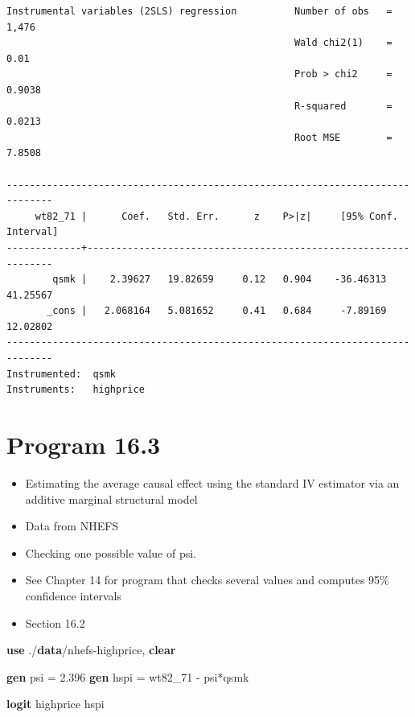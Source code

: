 \documentclass[
  10pt,
]{book}
\newenvironment{Shaded}{\begin{snugshade}}{\end{snugshade}}
\newcommand{\KeywordTok}[1]{\textcolor[rgb]{0.13,0.29,0.53}{\textbf{#1}}}
\newcommand{\NormalTok}[1]{#1}
\providecommand{\tightlist}{%
  \setlength{\itemsep}{0pt}\setlength{\parskip}{0pt}}
\begin{document}
\begin{verbatim}
Instrumental variables (2SLS) regression          Number of obs   =      1,476
                                                  Wald chi2(1)    =       0.01
                                                  Prob > chi2     =     0.9038
                                                  R-squared       =     0.0213
                                                  Root MSE        =     7.8508

------------------------------------------------------------------------------
     wt82_71 |      Coef.   Std. Err.      z    P>|z|     [95% Conf. Interval]
-------------+----------------------------------------------------------------
        qsmk |    2.39627   19.82659     0.12   0.904    -36.46313    41.25567
       _cons |   2.068164   5.081652     0.41   0.684     -7.89169    12.02802
------------------------------------------------------------------------------
Instrumented:  qsmk
Instruments:   highprice
\end{verbatim}

\hypertarget{program-16.3-1}{%
\section{Program 16.3}\label{program-16.3-1}}

\begin{itemize}
\tightlist
\item
  Estimating the average causal effect using the standard IV estimator via an additive marginal structural model
\item
  Data from NHEFS
\item
  Checking one possible value of psi.
\item
  See Chapter 14 for program that checks several values and computes 95\% confidence intervals\\
\item
  Section 16.2
\end{itemize}

\begin{Shaded}
\begin{Highlighting}[]
\KeywordTok{use}\NormalTok{ ./}\KeywordTok{data}\NormalTok{/nhefs{-}highprice, }\KeywordTok{clear}

\KeywordTok{gen}\NormalTok{ psi = 2.396}
\KeywordTok{gen}\NormalTok{ hspi = wt82\_71 {-} psi*qsmk}

\KeywordTok{logit}\NormalTok{ highprice hspi}
\end{Highlighting}
\end{Shaded}
\end{document}
